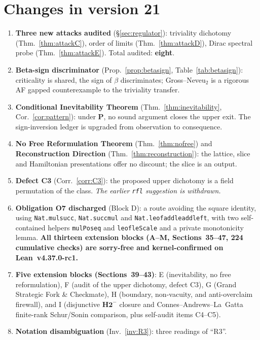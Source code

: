 \documentclass[11pt,a4paper]{article}
\theoremstyle{plain}
\theoremstyle{definition}
\theoremstyle{remark}
\renewcommand{\_}{\oldunderscore\allowbreak}
\newcommand{\Lean}[1]{\texttt{\small #1}}
\begin{document}
\section{Changes in version 21}
\begin{enumerate}[label=\textbf{V21.\arabic*.},leftmargin=42pt,itemsep=1pt]
\item \textbf{Three new attacks audited} (\S\ref{sec:regulator}): triviality dichotomy
(Thm.~\ref{thm:attackC}), order of limits (Thm.~\ref{thm:attackD}), Dirac spectral probe
(Thm.~\ref{thm:attackE}). Total audited: \textbf{eight}.
\item \textbf{Beta-sign discriminator} (Prop.~\ref{prop:betasign}, Table~\ref{tab:betasign}):
criticality is shared, the sign of $\beta$ discriminates; Gross--Neveu$_2$ is a rigorous AF
gapped counterexample to the triviality transfer.
\item \textbf{Conditional Inevitability Theorem} (Thm.~\ref{thm:inevitability},
Cor.~\ref{cor:pattern}): under \textbf{P}, no sound argument closes the upper exit. The
sign-inversion ledger is upgraded from observation to consequence.
\item \textbf{No Free Reformulation Theorem} (Thm.~\ref{thm:nofree}) and
\textbf{Reconstruction Direction} (Thm.~\ref{thm:reconstruction}): the lattice, slice and
Hamiltonian presentations offer no discount; the slice is an output.
\item \textbf{Defect C3} (Corr.~\ref{corr:C3}): the proposed upper dichotomy is a field
permutation of the class. \emph{The earlier \texttt{rfl} suggestion is withdrawn.}
\item \textbf{Obligation O7 discharged} (Block D): a route avoiding the square identity, using
\Lean{Nat.mul\_succ}, \Lean{Nat.succ\_mul} and \Lean{Nat.le\_of\_add\_le\_add\_left}, with two
self-contained helpers \Lean{mulPos\_eq} and \Lean{le\_of\_leScale} and a private monotonicity
lemma. \textbf{All thirteen extension blocks (A--M, Sections~35--47, 224 cumulative checks) are sorry-free and kernel-confirmed on Lean~v4.37.0-rc1.}
\item \textbf{Five extension blocks (Sections~39--43)}: E (inevitability, no free reformulation), F (audit of the upper dichotomy, defect C3), G (Grand Strategic Fork \& Checkmate), H (boundary, non-vacuity, and anti-overclaim firewall), and I (disjunctive $\textbf{H2}^-$ closure and Connes--Andrews--La~Gatta finite-rank Schur/Sonin comparison, plus self-audit items C4--C5).
\item \textbf{Notation disambiguation} (Inv.~\ref{inv:R3}): three readings of ``R3''.

\end{enumerate}
\end{document}
